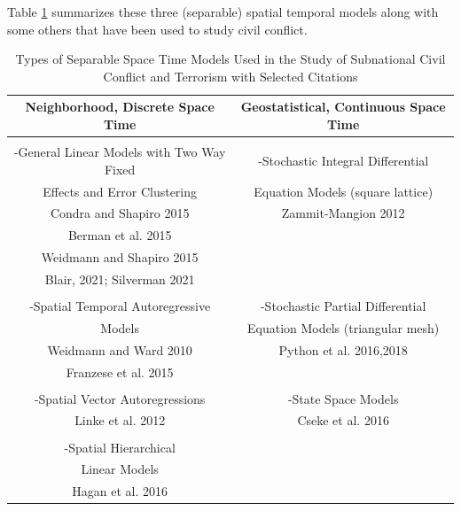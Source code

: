 \documentclass[12pt]{article}
\begin{document}
Table \ref{table:spatial_approaches} summarizes these three (separable) spatial temporal models along with some others
that have been used to study civil conflict.

\begin{table}
\centering
\begin{tabular}{|c|c|}
\hline Neighborhood, Discrete Space Time & Geostatistical, Continuous Space Time\\
\hline
 & \\
-General Linear Models with Two Way Fixed   & -Stochastic Integral Differential\\
Effects and Error Clustering & Equation Models (square lattice)\\
 Condra and Shapiro 2015 & Zammit-Mangion 2012 \\
 Berman et al. 2015 & \\
 Weidmann and Shapiro 2015 & \\
 Blair, 2021; Silverman 2021 & \\
  & \\
-Spatial Temporal Autoregressive & -Stochastic Partial Differential\\
Models & Equation Models (triangular mesh) \\
 Weidmann and Ward 2010 & Python et al. 2016,2018 \\
 Franzese et al. 2015 & \\
 & \\
-Spatial Vector Autoregressions & -State Space Models \\
Linke et al. 2012 & Cseke et al. 2016\\
 & \\
-Spatial Hierarchical & \\
Linear Models & \\
Hagan et al. 2016 & \\
\hline
\end{tabular}
\caption{Types of Separable Space Time Models Used in the Study of Subnational Civil Conflict and Terrorism
with Selected Citations}
\label{table:spatial_approaches}
\end{table}



\end{document}
